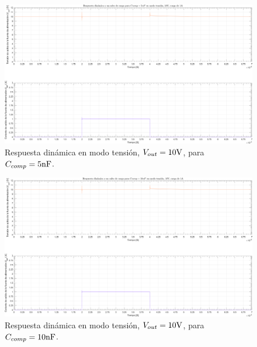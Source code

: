 \clearpage

\begin{figure}[H] %
\begin{center}
\includegraphics[width=1.1 \textwidth, angle=90]{./img/plots/dynamic/power_supply_CCOMP_5n_STEP_Modo1.png}
\caption{\label{fig:fig_power_supply_CCOMP_STEP_5n_Modo1}\footnotesize{Respuesta dinámica en modo tensión, $V_{out} = 10 \si[per-mode=symbol]{\volt}$, para $C_{comp} = 5 \si[per-mode=symbol]{\nano\farad} $.}}
\end{center}
\end{figure}

\clearpage

\begin{figure}[H] %
\begin{center}
\includegraphics[width=1.1 \textwidth, angle=90]{./img/plots/dynamic/power_supply_CCOMP_10n_STEP_Modo1.png}
\caption{\label{fig:fig_power_supply_CCOMP_STEP_10n_Modo1}\footnotesize{Respuesta dinámica en modo tensión, $V_{out} = 10 \si[per-mode=symbol]{\volt}$, para $C_{comp} = 10 \si[per-mode=symbol]{\nano\farad} $.}}
\end{center}
\end{figure}

